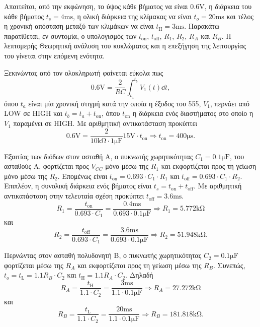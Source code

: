 Απαιτείται, από την εκφώνηση, το ύψος κάθε βήματος να είναι $0.6\unit{\volt}$, η διάρκεια του κάθε βήματος $t_s=4\unit{\ms}$, η ολική διάρκεια της κλίμακας να είναι $t_o=20\unit{\ms}$ και τέλος η χρονική απόσταση μεταξύ των κλιμάκων να είναι $t_{\mathrm{H}}=3\unit{\ms}$. Παρακάτω παρατίθεται, εν συντομία, ο υπολογισμός των $t_{\mathrm{on}}$, $t_{\mathrm{off}}$, $R_1$, $R_2$, $R_A$ και $R_B$. Η λεπτομερής Θεωρητική ανάλυση του κυκλώματος και η επεξήγηση της λειτουργίας του γίνεται στην επόμενη ενότητα.\par
Ξεκινώντας από τον ολοκληρωτή φαίνεται εύκολα πως
\begin{equation*}
	0.6\unit{\volt}=\frac{2}{RC}\int_{t_a}^{t_b}{V_1(t)\dd{t}},
\end{equation*}
όπου $t_a$ είναι μία χρονική στιγμή κατά την οποία η έξοδος του 555, $V_1$, περνάει από LOW σε HIGH και $t_b=t_a+t_{\mathrm{on}}$, όπου $t_{\mathrm{on}}$ η διάρκεια ενός διαστήματος στο οποίο η $V_1$ παραμένει σε HIGH. Με αριθμητική αντικατάσταση προκύπτει
\begin{equation*}
	0.6\unit{\volt}=\frac{2}{10\unit{\kilo\ohm}\cdot 1\unit{\micro\farad}}15\unit{\volt}\cdot t_{\mathrm{on}}\Rightarrow t_{\mathrm{on}}=400\unit{\micro\second}.
\end{equation*}

Εξαιτίας των διόδων στον ασταθή Α, ο πυκνωτής χωρητικότητας $C_1=0.1\unit{\micro\farad}$, του ασταθούς  Α, φορτίζεται προς $V_{CC}$ μόνο μέσω της $R_1$ και εκφορτίζεται προς τη γείωση μόνο μέσω της $R_2$. Επομένως είναι $t_{\mathrm{on}}=0.693\cdot C_1\cdot R_1$ και $t_{\mathrm{off}}=0.693\cdot C_1\cdot R_2$. Επιπλέον, η συνολική διάρκεια ενός βήματος είναι $t_s=t_{\mathrm{on}}+t_{\mathrm{off}}$. Με αριθμητική αντικατάσταση στην τελευταία σχέση προκύπτει $t_{\mathrm{off}}=3.6\unit{\ms}$.
\begin{equation*}
	R_1=\frac{t_{\mathrm{on}}}{0.693\cdot C_1}=\frac{0.4\unit{\ms}}{0.693\cdot 0.1\unit{\micro\farad}}\Rightarrow R_1=5.772\unit{\kilo\ohm}
\end{equation*}
και
\begin{equation*}
	R_2=\frac{t_{\mathrm{off}}}{0.693\cdot C_1}=\frac{3.6\unit{\ms}}{0.693\cdot 0.1\unit{\micro\farad}}\Rightarrow R_2=51.948\unit{\kilo\ohm}.
\end{equation*}

Περνώντας στον ασταθή πολυδονητή Β, ο πυκνωτής χωρητικότητας $C_2=0.1\unit{\micro\farad}$ φορτίζεται μέσω της $R_A$ και εκφορτίζεται προς τη γείωση μέσω της $R_B$. Συνεπώς, $t_o=t_{\mathrm{L}}=1.1R_B\cdot C_2$ και $t_{\mathrm{H}}=1.1R_A\cdot C_2$. Δηλαδή
\begin{equation*}
	R_Α=\frac{t_{\mathrm{H}}}{1.1\cdot C_2}=\frac{3\unit{\ms}}{1.1\cdot 0.1\unit{\micro\farad}}\Rightarrow R_A=27.272\unit{\kilo\ohm}
\end{equation*}
και
\begin{equation*}
	R_B=\frac{t_{\mathrm{L}}}{1.1\cdot C_2}=\frac{20\unit{\ms}}{1.1\cdot 0.1\unit{\micro\farad}}\Rightarrow R_B=181.818\unit{\kilo\ohm}.
\end{equation*}
